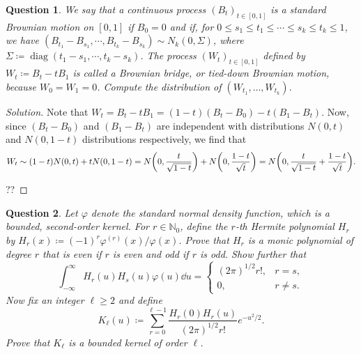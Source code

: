 \documentclass{article}
\theoremstyle{plain}
\newtheorem{question}{Question}
\theoremstyle{remark}
\newenvironment{solution}{\begin{proof}[Solution]\renewcommand\qedsymbol{}}{\end{proof}}
\renewcommand{\phi}{\varphi}
\newcommand{\Bb}{\mathbb}
\newcommand{\NN}{\Bb N}
\newcommand\ceq\coloneqq %
\DeclareMathOperator\diag{diag}
\begin{document}
\begin{question}
	We say that a continuous process $(B_t)_{t \in [0, 1]}$ is a \emph{standard Brownian motion} on $[0, 1]$ if $B_0 = 0$ and if, for $0 \leq s_1 \leq t_1 \leq \dotsb \leq s_k \leq t_k \leq 1$, we have $(B_{t_1} - B_{s_1}, \dotsb, B_{t_k} - B_{s_k}) \sim N_k(0, \Sigma)$, where $\Sigma \ceq \diag(t_ 1- s_1, \dotsb, t_k - s_k)$. The process $(W_t)_{t \in [0, 1]}$ defined by $W_t \ceq B_t - tB_1$ is called a \emph{Brownian bridge}, or \emph{tied-down Brownian motion}, because $W_0 = W_1 = 0$. Compute the distribution of $(W_{t_1}, \dotsc, W_{t_k})$. 
\end{question}

\begin{solution}
	Note that $W_t = B_t - t B_1 = (1-t) (B_t - B_0) - t (B_1 - B_t)$. Now, since $(B_t - B_0)$ and $(B_1 - B_t)$ are independent with distributions $N(0, t)$ and $N(0, 1-t)$ distributions respectively, we find that 
	\[
	W_t \sim (1-t) N(0, t) + t N(0, 1 - t) = N\qty(0, \frac{t}{\sqrt{1 - t}}) + N\qty(0, \frac{1-t}{\sqrt t}) = N\qty(0, \frac{t}{\sqrt{1 - t}} + \frac{1-t}{\sqrt t}). 
	\]
	
	??
\end{solution}

\begin{question}
	Let $\phi$ denote the standard normal density function, which is a bounded, second-order kernel. For $r \in \NN_0$, define the $r$-th Hermite polynomial $H_r$ by $H_r(x) \ceq (-1)^r \phi^{(r)}(x) / \phi(x)$. Prove that $H_r$ is a monic polynomial of degree $r$ that is even if $r$ is even and odd if $r$ is odd. Show further that
	\[
	\int_{-\infty}^\infty H_r(u) H_s(u) \phi(u) \dd{u} = \begin{cases}
		(2\pi)^{1/2} r!, & r=s, \\ 0 , & r \neq s.
	\end{cases}
	\]
	Now fix an integer $\ell \geq 2$ and define 
	\[
	K_\ell(u) \ceq \sum_{r=0}^{\ell -1 } \frac{H_r(0) H_r(u)}{(2\pi)^{1/2} r!} e^{-u^2/2}. 
	\]
	Prove that $K_\ell$ is a bounded kernel of order $\ell$. 
\end{question}
\end{document}
